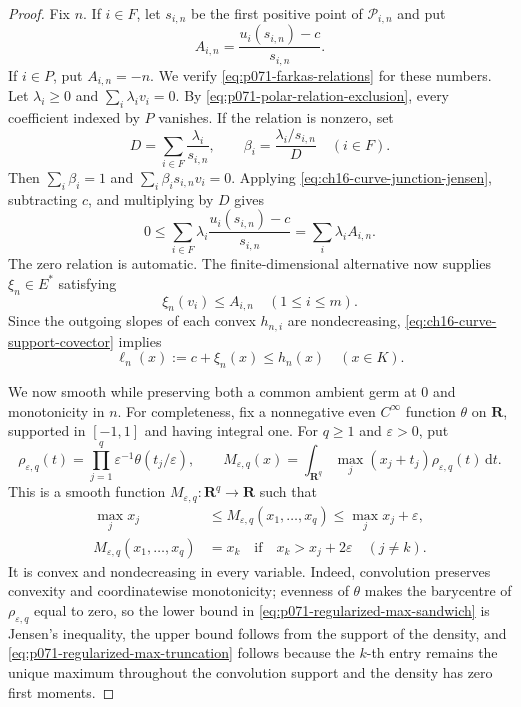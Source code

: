 \begin{proof}
Fix $n$.  If $i\in F$, let $s_{i,n}$ be the first positive point of
$\mathcal P_{i,n}$ and put
\[
                 A_{i,n}=\frac{u_i(s_{i,n})-c}{s_{i,n}}.
\]
If $i\in P$, put $A_{i,n}=-n$.  We verify
\eqref{eq:p071-farkas-relations} for these numbers.  Let
$\lambda_i\geq0$ and $\sum_i\lambda_i v_i=0$.  By
\eqref{eq:p071-polar-relation-exclusion}, every coefficient indexed by
$P$ vanishes.  If the relation is nonzero, set
\begin{equation}
\label{eq:p071-junction-weights-from-relation}
 D=\sum_{i\in F}\frac{\lambda_i}{s_{i,n}},
 \qquad
 \beta_i=\frac{\lambda_i/s_{i,n}}{D}\quad(i\in F).
\end{equation}
Then $\sum_i\beta_i=1$ and
$\sum_i\beta_i s_{i,n}v_i=0$.  Applying
\eqref{eq:ch16-curve-junction-jensen}, subtracting $c$, and multiplying by $D$
gives
\begin{equation}
\label{eq:p071-slope-relation}
 0\leq\sum_{i\in F}\lambda_i
       \frac{u_i(s_{i,n})-c}{s_{i,n}}
   =\sum_i\lambda_iA_{i,n}.
\end{equation}
The zero relation is automatic.  The finite-dimensional alternative now
supplies $\xi_n\in E^*$ satisfying
\begin{equation}
\label{eq:ch16-curve-support-covector}
                         \xi_n(v_i)\leq A_{i,n}
                         \quad(1\leq i\leq m).
\end{equation}
Since the outgoing slopes of each convex $h_{n,i}$ are nondecreasing,
\eqref{eq:ch16-curve-support-covector} implies
\begin{equation}
\label{eq:p071-common-affine-minorant}
                  \ell_n(x):=c+\xi_n(x)\leq h_n(x)
                  \quad(x\in K).
\end{equation}

We now smooth while preserving both a common ambient germ at $0$ and
monotonicity in $n$.  For completeness, fix a nonnegative even
$C^\infty$ function $\theta$ on $\mathbf R$, supported in $[-1,1]$ and
having integral one.  For $q\geq1$ and $\varepsilon>0$, put
\[
 \rho_{\varepsilon,q}(t)
   =\prod_{j=1}^q\varepsilon^{-1}\theta(t_j/\varepsilon),
 \qquad
 M_{\varepsilon,q}(x)
   =\int_{\mathbf R^q}\max_j(x_j+t_j)
       \rho_{\varepsilon,q}(t)\,\mathrm d t.
\]
This is a smooth function $M_{\varepsilon,q}:\mathbf R^q\to\mathbf R$
such that
\begin{align}
 \max_j x_j
 &\leq M_{\varepsilon,q}(x_1,\ldots,x_q)
 \leq \max_jx_j+\varepsilon,
 \label{eq:p071-regularized-max-sandwich}\\
 M_{\varepsilon,q}(x_1,\ldots,x_q)&=x_k
 \quad\text{if}\quad
 x_k>x_j+2\varepsilon\quad(j\neq k).
 \label{eq:p071-regularized-max-truncation}
\end{align}
It is convex and nondecreasing in every variable.  Indeed, convolution
preserves convexity and coordinatewise monotonicity; evenness of $\theta$
makes the barycentre of $\rho_{\varepsilon,q}$ equal to zero, so the lower
bound in
\eqref{eq:p071-regularized-max-sandwich} is Jensen's inequality, the upper
bound follows from the support of the density, and
\eqref{eq:p071-regularized-max-truncation} follows because the $k$-th
entry remains the unique maximum throughout the convolution support and
the density has zero first moments.


\end{proof}
